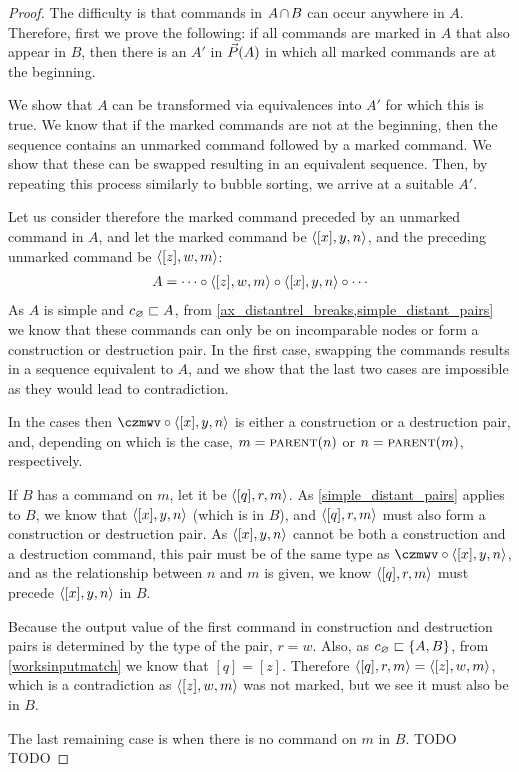 \begin{proof}
The difficulty is that commands in $\acbnp$ can occur anywhere in $A$.
Therefore, first we prove the following:
if all commands are marked in $A$ that also appear in $B$,
then there is an $A'$ in $\vec{P}({A})$ in which all marked commands are at the beginning.

We show that $A$ can be transformed via equivalences into $A'$ for which this is true.
We know that if the marked commands are not at the beginning, then
the sequence contains an unmarked command followed by a marked command.
We show that these can be swapped resulting in an equivalent sequence.
Then, by repeating this process similarly to bubble sorting, we arrive at 
a suitable $A'$.

Let us consider therefore the marked command preceded by an unmarked command in $A$,
and let the marked command be $\langle{[x],y,n}\rangle$, 
and the preceding unmarked command be $\langle{[z],w,m}\rangle$:
\begin{gather*}
A = \cdots\circ  \langle{[z],w,m}\rangle\circ  \langle{[x],y,n}\rangle\circ  \cdots
\end{gather*}
As $A$ is simple and $c_\varnothing\sqsubset{A}$, from 
\cref{ax_distantrel_breaks,simple_distant_pairs}
we know that these commands can only be on incomparable nodes or form a construction or destruction pair.
In the first case, swapping the commands results in a sequence equivalent to $A$,
and we show that the last two cases are impossible as they would lead to contradiction.

In the cases then $\czmwv\cc\cxynv$ is either a construction or a destruction pair,
and, depending on which is the case,
$m=\text{\normalfont\scshape{parent}}(n)$ or $n=\text{\normalfont\scshape{parent}}(m)$, respectively.

If $B$ has a command on $m$, let it be $\langle{[q],r,m}\rangle$.
As \cref{simple_distant_pairs} applies to $B$, we know that
$\langle{[x],y,n}\rangle$ (which is in $B$), and $\langle{[q],r,m}\rangle$ must also form a construction
or destruction pair.
As $\langle{[x],y,n}\rangle$ cannot be both a construction and a destruction command,
this pair must be of the same type as $\czmwv\cc\cxynv$,
and as the relationship between $n$ and $m$ is given,
we know $\langle{[q],r,m}\rangle$ must precede $\langle{[x],y,n}\rangle$ in $B$.

Because the output value of the first command in construction
and destruction pairs is determined by the type of the pair,
$r=w$.
Also, as $c_\varnothing\sqsubset{\{{A,B}\}}$, 
from \cref{worksinputmatch}
we know that $[q]=[z]$.
Therefore $\langle{[q],r,m}\rangle=\langle{[z],w,m}\rangle$,
which is a contradiction as $\langle{[z],w,m}\rangle$ was not marked,
but we see it must also be in $B$.

The last remaining case is when there is no command on $m$ in $B$.
TODO
TODO


\end{proof}
